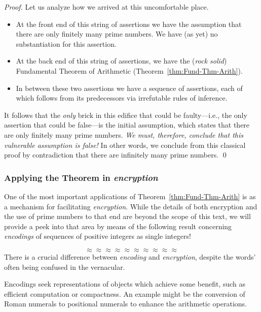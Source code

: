 \begin{proof}
Let us analyze how we arrived at this uncomfortable place.
\begin{itemize}
\item
At the front end of this string of assertions we have the assumption
that there are only finitely many prime numbers.  We have (as yet) no
substantiation for this assertion.
\item
At the back end of this string of assertions, we have the ({\em rock
  solid}) Fundamental Theorem of Arithmetic
(Theorem~\ref{thm:Fund-Thm-Arith}).
\item
In between these two assertions we have a sequence of assertions, each
of which follows from its predecessors via irrefutable rules of
inference.
\end{itemize}
It follows that the {\em only} brick in this edifice that could be
faulty---i.e., the only assertion that could be false---is the initial
assumption, which states that there are only finitely many prime
numbers.  {\em We must, therefore, conclude that this vulnerable
  assumption is false!}  In other words, we conclude from this
classical proof by contradiction that there are infinitely many prime
numbers.  \qed
\end{proof}


\subsubsection{Applying the Theorem in {\em encryption}}
\label{sec:apply-FTA}

One of the most important applications of Theorem~\ref{thm:Fund-Thm-Arith} is
as a mechanism for facilitating {\em encryption}.
%
While the details of both encryption and the use of prime numbers to
that end are beyond the scope of this text, we will provide a peek
into that area by means of the following result concerning {\it
  encodings} of sequences of positive integers as single integers!

\[ \approx \approx \approx \approx \approx \approx \approx \approx \approx \approx \]
There is a crucial difference between {\em encoding} and {\em
  encryption}, despite the words' often being confused in the
vernacular.

Encodings seek representations of objects which achieve some benefit,
such as efficient computation or compactness.  An example might be the
conversion of Roman numerals to positional numerals to enhance the
arithmetic operations.

